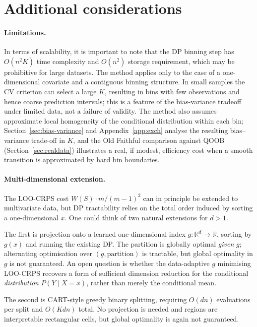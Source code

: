 \documentclass[11pt]{article}
\begin{document}
\section{Additional considerations}
\label{sec:additional}
\paragraph{Limitations.}
In terms of scalability, it is important to note that the DP binning step has 
$O(n^2 K)$ time complexity and $O(n^2)$ storage requirement, which may be 
prohibitive for large datasets.
The method applies only to the case of a one-dimensional covariate and a contiguous binning structure.
In small samples the CV criterion can select a large $K$, resulting in bins with
few observations and hence coarse prediction intervals; this is a feature of the
bias-variance tradeoff under limited data, not a failure of validity.
The method also assumes approximate local homogeneity of the conditional
distribution within each bin; Section~\ref{sec:bias-variance} and
Appendix~\ref{app:exch} analyse the resulting bias--variance trade-off in $K$,
and the Old Faithful comparison against QOOB (Section~\ref{sec:realdata})
illustrates a real, if modest, efficiency cost when a smooth transition is
approximated by hard bin boundaries.

\paragraph{Multi-dimensional extension.}
The LOO-CRPS cost $W(S)\cdot m/(m-1)^2$ can in principle be extended to multivariate data, but DP tractability
relies on the total order induced by sorting a one-dimensional $x$.
One could think of two natural extensions for $d > 1$.

The first is projection onto a learned one-dimensional index $g:\mathbb{R}^d\to\mathbb{R}$,
sorting by $g(x)$ and running the existing DP.
The partition is globally optimal \emph{given} $g$; alternating optimisation
over $(g, \text{partition})$ is tractable, but global optimality in $g$ is not
guaranteed.
An open question is whether the data-adaptive $g$ minimising LOO-CRPS recovers
a form of sufficient dimension reduction for the conditional \emph{distribution}
$P(Y\mid X=x)$, rather than merely the conditional mean.

The second is CART-style greedy binary splitting, requiring $O(dn)$ evaluations
per split and $O(Kdn)$ total.
No projection is needed and regions are interpretable rectangular cells, but global
optimality is again not guaranteed.
\end{document}
